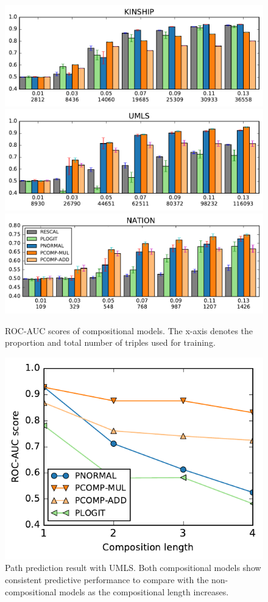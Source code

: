 \begin{figure}[t]
	\centering
	\includegraphics[width=\linewidth]{images/comp_training_error_kinship_small.pdf}
	\includegraphics[width=\linewidth]{images/comp_training_error_umls_small.pdf}			
	\includegraphics[width=\linewidth]{images/comp_training_error_nation_small.pdf}				
	\caption{\label{fig:r_vs_br} ROC-AUC scores of compositional models. 
	The x-axis denotes the proportion and total number of triples used for training. %
}
\end{figure} 

\begin{figure}[t]
	\centering
	\includegraphics[width=0.7\linewidth]{images/path_prediction2.pdf}
	\caption{\label{fig:path_pred} Path prediction result with UMLS. Both compositional models show consistent predictive performance to compare with the non-compositional models as the compositional length increases.}
\end{figure}

